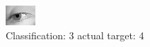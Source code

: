 \begin{figure}[h!]
\begin{center}
\includegraphics[width=0.60\columnwidth]{figures/ID2914_class_3_target_4.png}
\end{center}
\caption{ Classification: 3 actual target: 4}
\label{fig:ID2914_class_3_target_4}
\end{figure}
